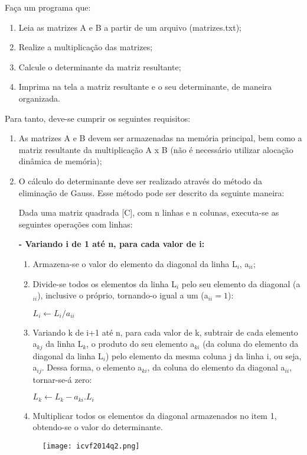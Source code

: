 \documentclass[12pt,a4paper]{article}
\begin{document}
Faça um programa que:
\begin{enumerate}[label=\alph*.]
\item Leia as matrizes A e B a partir de um arquivo (matrizes.txt);
\item Realize a multiplicação das matrizes;
\item Calcule o determinante da matriz resultante;
\item Imprima na tela a matriz resultante e o seu determinante, de maneira organizada.
\end{enumerate}
Para tanto, deve-se cumprir os seguintes requisitos:
\begin{enumerate}[label=\alph*.]
\item As matrizes A e B devem ser armazenadas na memória principal, bem como a matriz
resultante da multiplicação A x B (não é necessário utilizar alocação dinâmica de memória);
\item O cálculo do determinante deve ser realizado através do método da eliminação de Gauss. Esse
método pode ser descrito da seguinte maneira:

Dada uma matriz quadrada [C], com n linhas e n colunas, executa-se as seguintes operações
com linhas:

\textbf{- Variando i de 1 até n, para cada valor de i:}
\begin{enumerate}[label=\arabic*.]
\item Armazena-se o valor do elemento da diagonal da linha L$_i$, a$_{ii}$;
\item Divide-se todos os elementos da linha L$_i$ pelo seu elemento da diagonal (a$_{ii}$), inclusive o
próprio, tornando-o igual a um (a$_{ii}=1$):
\begin{center}
$L_i \leftarrow L_i/a_{ii}$
\end{center}
\item Variando k de i+1 até n, para cada valor de k, subtrair de cada elemento a$_{kj}$ da linha L$_k$, o
produto do seu elemento a$_{ki}$ (da coluna do elemento da diagonal da linha L$_i$) pelo elemento da
mesma coluna j da linha i, ou seja, a$_{ij}$. Dessa forma, o elemento a$_{ki}$, da coluna do elemento da
diagonal a$_{ii}$, tornar-se-á zero:
\begin{center}
$L_k \leftarrow L_k - a_{ki} . L_i$
\end{center}
\item Multiplicar todos os elementos da diagonal armazenados no item 1, obtendo-se o valor do
determinante.

\end{enumerate}
\newpage
\begin{figure}[ht]
\centering
\texttt{[image: icvf2014q2.png]}
\end{figure}


\end{enumerate}
\end{document}
